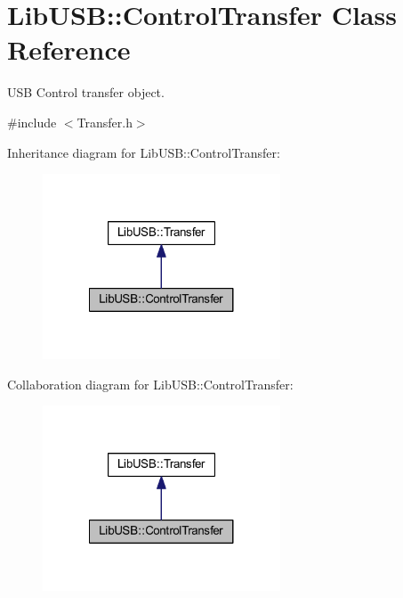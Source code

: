 \hypertarget{class_lib_u_s_b_1_1_control_transfer}{\section{Lib\-U\-S\-B\-:\-:Control\-Transfer Class Reference}
\label{class_lib_u_s_b_1_1_control_transfer}
}


U\-S\-B Control transfer object.  




{\ttfamily \#include $<$Transfer.\-h$>$}



Inheritance diagram for Lib\-U\-S\-B\-:\-:Control\-Transfer\-:\nopagebreak
\begin{figure}[H]
\begin{center}
\leavevmode
\includegraphics[width=200pt]{class_lib_u_s_b_1_1_control_transfer__inherit__graph}
\end{center}
\end{figure}


Collaboration diagram for Lib\-U\-S\-B\-:\-:Control\-Transfer\-:\nopagebreak
\begin{figure}[H]
\begin{center}
\leavevmode
\includegraphics[width=200pt]{class_lib_u_s_b_1_1_control_transfer__coll__graph}
\end{center}
\end{figure}
